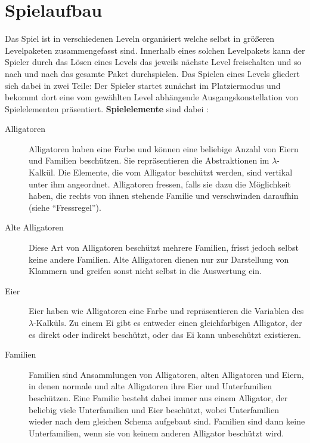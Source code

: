 \section{Spielaufbau}

Das Spiel ist in verschiedenen Leveln organisiert welche selbst in größeren Levelpaketen zusammengefasst sind. Innerhalb eines solchen Levelpakets kann der Spieler durch das Lösen eines Levels das jeweils nächste Level freischalten und so nach und nach das gesamte Paket durchspielen. Das Spielen eines Levels gliedert sich dabei in zwei Teile:
Der Spieler startet zunächst im Platziermodus und bekommt dort eine vom gewählten Level abhängende Ausgangskonstellation von Spielelementen präsentiert. \textbf{Spielelemente} sind dabei :

	\begin{description}
		\item[Alligatoren] Alligatoren haben eine Farbe und können eine beliebige Anzahl von Eiern und Familien beschützen.
		Sie repräsentieren die Abstraktionen im \(\lambda\)-Kalkül.
		Die Elemente, die vom Alligator beschützt werden, sind vertikal unter ihm angeordnet.
		Alligatoren fressen, falls sie dazu die Möglichkeit haben, die rechts von ihnen stehende Familie und verschwinden daraufhin (siehe "`Fressregel"').

		\item[Alte Alligatoren] Diese Art von Alligatoren beschützt mehrere Familien, frisst jedoch selbst keine andere Familien.
		Alte Alligatoren dienen nur zur Darstellung von Klammern und greifen sonst nicht selbst in die Auswertung ein.

		\item[Eier] Eier haben wie Alligatoren eine Farbe und repräsentieren die Variablen des \(\lambda\)-Kalküls.
		Zu einem Ei gibt es entweder einen gleichfarbigen Alligator, der es direkt oder indirekt beschützt, oder das Ei kann unbeschützt existieren.

		\item[Familien] Familien sind Ansammlungen von Alligatoren, alten Alligatoren und Eiern, in denen normale und alte Alligatoren ihre Eier und Unterfamilien beschützen.
		Eine Familie besteht dabei immer aus einem Alligator, der beliebig viele Unterfamilien und Eier beschützt, wobei Unterfamilien wieder nach dem gleichen Schema aufgebaut sind.
		Familien sind dann keine Unterfamilien, wenn sie von keinem anderen Alligator beschützt wird.

	\end{description}


